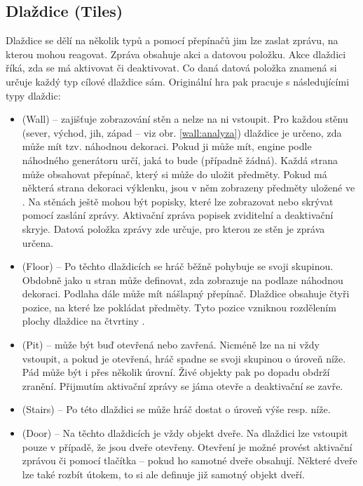 \subsection{Dlaždice (Tiles)}

Dlaždice se dělí na několik typů a pomocí přepínačů jim lze zaslat zprávu, na kterou mohou reagovat. Zpráva obsahuje akci a datovou položku. 
Akce dlaždici říká, zda se má aktivovat či deaktivovat. Co daná datová položka znamená si určuje každý typ cílové dlaždice sám. 
Originální hra pak pracuje s následujícími typy dlaždic:
\begin{itemize}
\item {} (Wall) -- zajišťuje zobrazování stěn a nelze na ni vstoupit. Pro každou stěnu  (sever, východ, jih, západ -- viz obr. \ref{wall:analyza}) dlaždice 
	je určeno, zda může mít tzv. náhodnou dekoraci. Pokud ji může mít, engine podle náhodného generátoru
	určí, jaká to bude (případně žádná). Každá strana  může obsahovat přepínač, který si může do  uložit předměty.
	Pokud má některá strana dekoraci výklenku, jsou v něm zobrazeny předměty uložené ve .
	Na stěnách  ještě mohou být popisky, které lze zobrazovat nebo skrývat pomocí zaslání zprávy. Aktivační zpráva 
	popisek zviditelní a deaktivační skryje. Datová položka zprávy zde určuje, pro kterou ze stěn  je zpráva určena.

\item {} (Floor) -- Po těchto dlaždicích se hráč běžně pohybuje se svoji skupinou. Obdobně jako u stran  může definovat,
	zda zobrazuje na podlaze náhodnou dekoraci. Podlaha dále může mít nášlapný přepínač. Dlaždice obsahuje čtyři pozice,
	na které lze pokládat předměty. Tyto pozice vzniknou rozdělením plochy dlaždice na čtvrtiny .


\item {} (Pit) --  může být buď otevřená nebo zavřená. Nicméně lze na ni vždy vstoupit, a pokud je otevřená, 
	hráč spadne se svoji skupinou o úroveň níže. Pád může být i přes několik úrovní. Živé objekty pak po
	dopadu obdrží zranění. Přijmutím aktivační zprávy se jáma otevře a deaktivační se zavře.

\item {} (Stairs) -- Po této dlaždici se může hráč dostat o úroveň výše resp. níže.

\item {} (Door) -- Na těchto dlaždicích je vždy objekt dveře. Na dlaždici lze vstoupit pouze v případě, že jsou dveře
	otevřeny. Otevření je možné provést aktivační zprávou či pomocí tlačítka -- pokud ho samotné dveře obsahují. 
	Některé dveře lze také rozbít útokem, to si ale definuje již samotný objekt dveří.


\end{itemize}
